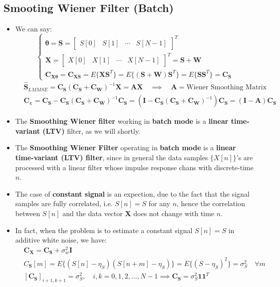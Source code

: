 \subsection{Smooting Wiener Filter (Batch)}
\begin{itemize}
\item We can say:
\[
\begin{cases}
    \boldsymbol{\theta} = \mathbf{S} = \begin{bmatrix} S[0] & S[1] & \cdots & S[N-1] \end{bmatrix}^T \\[8pt]
    \mathbf{X} = \begin{bmatrix} X[0] & X[1] & \cdots & X[N-1] \end{bmatrix}^T = \mathbf{S} + \mathbf{W} \\[8pt]
    \mathbf{C}_{\mathbf{X}\boldsymbol{\theta}} = \mathbf{C}_{\mathbf{X}\mathbf{S}} = E\{\mathbf{X}\mathbf{S}^T\} = E\{(\mathbf{S} + \mathbf{W})\mathbf{S}^T\} = E\{\mathbf{S}\mathbf{S}^T\} = \mathbf{C}_{\mathbf{S}}
\end{cases}\]
\begin{align*}
&\mathbf{\hat{S}}_{LMMSE} = \mathbf{C}_{\mathbf{S}}(\mathbf{C}_{\mathbf{S}} + \mathbf{C}_{\mathbf{W}})^{-1}\mathbf{X} = \mathbf{A}\mathbf{X} \quad \implies \quad \mathbf{A} = \text{Wiener Smoothing Matrix}\\[10pt]
&\mathbf{C}_{\boldsymbol{\varepsilon}} = \mathbf{C}_{\mathbf{S}} - \mathbf{C}_{\mathbf{S}}(\mathbf{C}_{\mathbf{S}} + \mathbf{C}_{\mathbf{W}})^{-1}\mathbf{C}_{\mathbf{S}} = (\mathbf{I} - \mathbf{C}_{\mathbf{S}}(\mathbf{C}_{\mathbf{S}} + \mathbf{C}_{\mathbf{W}})^{-1})\mathbf{C}_{\mathbf{S}} = (\mathbf{I} - \mathbf{A})\mathbf{C}_{\mathbf{S}}
\end{align*}
    \item The \textbf{Smoothing Wiener filter} working in \textbf{batch mode} is a \textbf{linear time-variant (LTV)} filter, as we will shortly.
    \item The \textbf{Smoothing Wiener Filter} operating in \textbf{batch mode} is a \textbf{linear time-variant (LTV) filter}, since in general the data samples \(\{X[n]\}\)'s are processed with a linear filter whose impulse response chans with discrete-time \(n\).
    \item The case of \textbf{constant signal} is an expection, due to the fact that the signal samples are fully correlated, i.e. \(S[n]=S\) for any \(n\), hence the correlation between \(S[n]\) and the data vector \textbf{X} does not change with time \(n\).
    \item In fact, when the problem is to estimate a constant signal \(S[n]=S\) in additive white noise, we have:
\begin{align*}
&\mathbf{C}_{\mathbf{X}} = \mathbf{C}_{\mathbf{S}} + \sigma_{w}^2 \mathbf{I} \\[8pt]
&C_{\mathbf{S}}[m] = E\{(S[n] - \eta_S)(S[n+m] - \eta_S)\}= E\{(S - \eta_S)^2\} = \sigma_{S}^2 \quad \forall m \\[8pt]
&[\mathbf{C}_{\mathbf{S}}]_{i+1, k+1} = \sigma_{S}^2, \quad i, k = 0, 1, 2, \dots, N-1 
\implies \mathbf{C}_{\mathbf{S}} = \sigma_{S}^2 \mathbf{1}\mathbf{1}^T
\end{align*}


\end{itemize}
